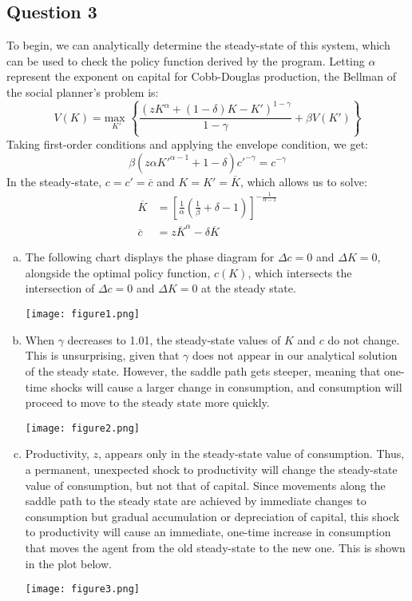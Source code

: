 \documentclass{article}
\newcommand{\usmax}[1]{\underset{#1}{\text{max }}}
\begin{document}
\subsection*{Question 3}
To begin, we can analytically determine the steady-state of this system, which can be used to check the policy function derived by the program. Letting $\alpha$ represent the exponent on capital for Cobb-Douglas production, the Bellman of the social planner's problem is:
\[
	V(K) = \usmax{K'}\left\{\frac{\left(zK^\alpha + (1-\delta)K -K'\right)^{1-\gamma}}{1-\gamma} + \beta V(K')\right\}
\]
Taking first-order conditions and applying the envelope condition, we get:
\[
	\beta\left(z\alpha K'^{\alpha-1}+1-\delta\right)c'^{-\gamma} = c^{-\gamma}
\]
In the steady-state, $c=c'=\overline{c}$ and $K=K'=\overline{K}$, which allows us to solve:
\begin{align*}
	\overline{K} &= \left[\frac{1}{\alpha}\left(\frac{1}{\beta} + \delta - 1\right)\right]^{-\frac{1}{\alpha-1}}	\\
	\overline{c} &= z\overline{K}^\alpha - \delta\overline{K}
\end{align*}
\pagebreak
\begin{enumerate}[(a)]
	\item The following chart displays the phase diagram for ${\Delta c=0}$ and ${\Delta K=0}$, alongside the optimal policy function, $c(K)$, which intersects the intersection of ${\Delta c=0}$ and ${\Delta K=0}$ at the steady state.
		\begin{center}
			\texttt{[image: figure1.png]}
		\end{center}
	
\pagebreak
	\item When $\gamma$ decreases to 1.01, the steady-state values of $K$ and $c$ do not change. This is unsurprising, given that $\gamma$ does not appear in our analytical solution of the steady state. However, the saddle path gets steeper, meaning that one-time shocks will cause a larger change in consumption, and consumption will proceed to move to the steady state more quickly.
		\begin{center}
			\texttt{[image: figure2.png]}
		\end{center}
	
\pagebreak
	\item Productivity, $z$, appears only in the steady-state value of consumption. Thus, a permanent, unexpected shock to productivity will change the steady-state value of consumption, but not that of capital. Since movements along the saddle path to the steady state are achieved by immediate changes to consumption but gradual accumulation or depreciation of capital, this shock to productivity will cause an immediate, one-time increase in consumption that moves the agent from the old steady-state to the new one. This is shown in the plot below.
		\begin{center}
			\texttt{[image: figure3.png]}
		\end{center}
	
\end{enumerate}

\end{document}
